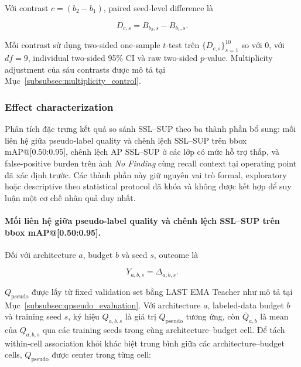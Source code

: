 \documentclass[pdflatex,sn-mathphys-num]{sn-jnl}%
\theoremstyle{thmstyleone}%
\theoremstyle{thmstyletwo}%
\theoremstyle{thmstylethree}%
\begin{document}
Với contrast \(c=(b_2-b_1)\), paired seed-level difference là

\begin{equation}
D_{c,s}
=
B_{b_2,s}-B_{b_1,s}.
\label{eq:budget_pairwise_difference}
\end{equation}

Mỗi contrast sử dụng two-sided one-sample \(t\)-test trên
\(\{D_{c,s}\}_{s=1}^{10}\) so với \(0\), với \(df=9\), individual
two-sided 95\% CI và raw two-sided \(p\)-value. Multiplicity adjustment của
sáu contrasts được mô tả tại
Mục~\ref{subsubsec:multiplicity_control}.

\subsubsection{Effect characterization}
\label{subsubsec:sq2_effect_characterization}

Phân tích đặc trưng kết quả so sánh SSL--SUP theo ba thành phần bổ sung:
mối liên hệ giữa pseudo-label quality và chênh lệch SSL--SUP trên bbox mAP@[0.50:0.95], chênh lệch AP SSL--SUP ở các lớp có mức hỗ trợ thấp,
và false-positive burden trên ảnh \textit{No Finding} cùng recall context
tại operating point đã xác định trước. Các thành phần này giữ nguyên vai trò
formal, exploratory hoặc descriptive theo statistical protocol đã khóa và
không được kết hợp để suy luận một cơ chế nhân quả duy nhất.

\paragraph{Mối liên hệ giữa pseudo-label quality và chênh lệch SSL--SUP trên bbox mAP@[0.50:0.95].}

Đối với architecture \(a\), budget \(b\) và seed \(s\), outcome là

\begin{equation}
Y_{a,b,s}
=
\Delta_{a,b,s}.
\label{eq:rq4_outcome}
\end{equation}

\(Q_{\mathrm{pseudo}}\) được lấy từ fixed validation set bằng LAST EMA
Teacher như mô tả tại Mục~\ref{subsubsec:qpseudo_evaluation}. Với architecture
\(a\), labeled-data budget \(b\) và training seed \(s\), ký hiệu
\(Q_{a,b,s}\) là giá trị \(Q_{\mathrm{pseudo}}\) tương ứng, còn
\(\overline{Q}_{a,b}\) là mean của \(Q_{a,b,s}\) qua các training seeds
trong cùng architecture--budget cell. Để tách within-cell association khỏi
khác biệt trung bình giữa các architecture--budget cells,
\(Q_{\mathrm{pseudo}}\) được center trong từng cell:
\end{document}
